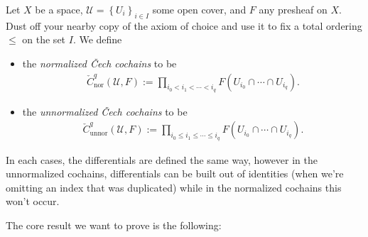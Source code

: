 \documentclass[11pt]{amsart}
\begin{document}
\begin{definition}\label{def:normalized-unnormalized-cochains} Let $X$ be a space, $\mathcal{U} = \left\{ U_i \right\}_{i\in I}$ some open cover, and $F$ any presheaf on $X$. Dust off your nearby copy of the axiom of choice and use it to fix a total ordering $\le$ on the set $I$. We define
\begin{itemize}
    \item the \emph{normalized \v{C}ech cochains} to be
    \begin{align*}
        \check{C}^q_\text{nor}(\mathcal{U},F) := \prod_{i_0 < i_1 < \cdots < i_q} F(U_{i_0}\cap \cdots \cap U_{i_q}).
    \end{align*}
    \item the \emph{unnormalized \v{C}ech cochains} to be
    \begin{align*}
        \check{C}^q_\text{unnor}(\mathcal{U},F) := \prod_{i_0\le i_1\le \cdots \le i_q} F(U_{i_0}\cap \cdots \cap U_{i_q}).
    \end{align*}
\end{itemize}
In each cases, the differentials are defined the same way, however in the unnormalized cochains, differentials can be built out of identities (when we're omitting an index that was duplicated) while in the normalized cochains this won't occur.
\end{definition}

The core result we want to prove is the following:
\end{document}
